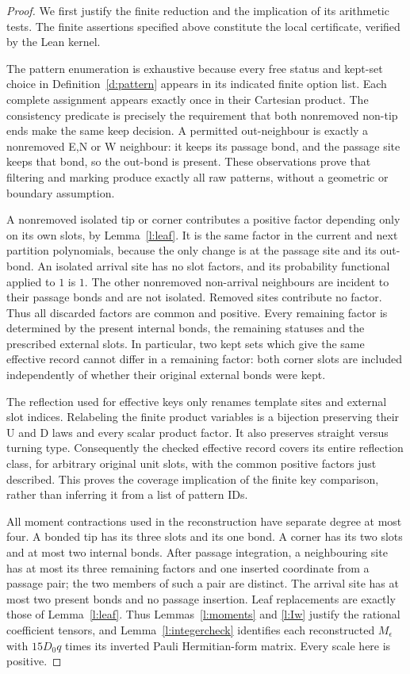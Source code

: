 \begin{proof}
We first justify the finite reduction and the implication of its
arithmetic tests. The finite assertions specified above constitute
the local certificate, verified by the Lean kernel.

The pattern enumeration is exhaustive because every free status
and kept-set choice in Definition~\ref{d:pattern} appears in its
indicated finite option list. Each complete assignment appears
exactly once in their Cartesian product. The consistency predicate
is precisely the requirement that both nonremoved non-tip ends
make the same keep decision. A permitted out-neighbour is exactly
a nonremoved E,N or W neighbour: it keeps its passage bond, and
the passage site keeps that bond, so the out-bond is present.
These observations prove that filtering and marking produce
exactly all raw patterns, without a geometric or boundary assumption.

A nonremoved isolated tip or corner contributes a positive factor
depending only on its own slots, by Lemma~\ref{l:leaf}. It is
the same factor in the current and next partition polynomials,
because the only change is at the passage site and its out-bond.
An isolated arrival site has no slot factors, and its probability
functional applied to \(1\) is \(1\). The other nonremoved
non-arrival neighbours are incident to their passage bonds and
are not isolated. Removed sites contribute no factor. Thus all
discarded factors are common and positive. Every remaining factor
is determined by the present internal bonds, the remaining statuses
and the prescribed external slots. In particular, two kept sets
which give the same effective record cannot differ in a remaining
factor: both corner slots are included independently of whether
their original external bonds were kept.

The reflection used for effective keys only renames template sites
and external slot indices. Relabeling the finite product variables
is a bijection preserving their U and D laws and every scalar
product factor. It also preserves straight versus turning type.
Consequently the checked effective record covers its entire
reflection class, for arbitrary original unit slots, with the
common positive factors just described. This proves the coverage
implication of the finite key comparison, rather than inferring it
from a list of pattern IDs.

All moment contractions used in the reconstruction have separate
degree at most four. A bonded tip has its three slots and its one
bond. A corner has its two slots and at most two internal bonds.
After passage integration, a neighbouring site has at most its
three remaining factors and one inserted coordinate from a passage
pair; the two members of such a pair are distinct. The arrival
site has at most two present bonds and no passage insertion.
Leaf replacements are exactly those of Lemma~\ref{l:leaf}.
Thus Lemmas~\ref{l:moments} and \ref{l:Iw} justify the rational
coefficient tensors, and Lemma~\ref{l:integercheck} identifies each
reconstructed \(M_\epsilon\) with \(15D_0q\) times its inverted
Pauli Hermitian-form matrix. Every scale here is positive.


\end{proof}
